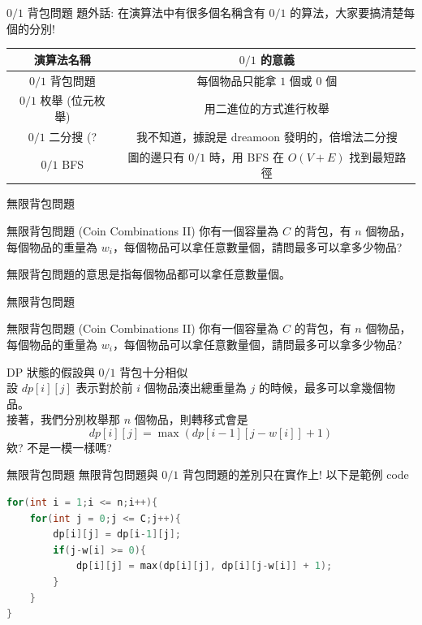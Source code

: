 \documentclass[aspectratio=169]{beamer}
\begin{document}
\begin{frame}{$0/1$ 背包問題}
    題外話: 在演算法中有很多個名稱含有 $0/1$ 的算法，大家要搞清楚每個的分別!
    \begin{center}
        \begin{tabular}{|c|c|}
            \hline 
            演算法名稱 & $0/1$ 的意義 \\ \hline \hline
            $0/1$ 背包問題 & 每個物品只能拿 $1$ 個或 $0$ 個 \\ \hline
            $0/1$ 枚舉 (位元枚舉) & 用二進位的方式進行枚舉 \\ \hline
            $0/1$ 二分搜 (? & 我不知道，據說是 dreamoon 發明的，倍增法二分搜 \\ \hline
            $0/1$ BFS & 圖的邊只有 $0/1$ 時，用 BFS 在 $O(V+E)$ 找到最短路徑 \\ \hline
        \end{tabular}
    \end{center}
\end{frame}

\begin{frame}{無限背包問題}
    \begin{block}{無限背包問題 (Coin Combinations II)}
        你有一個容量為 $C$ 的背包，有 $n$ 個物品，每個物品的重量為 $w_i$，每個物品可以拿任意數量個，請問最多可以拿多少物品?
    \end{block} \pause
    無限背包問題的意思是指每個物品都可以拿任意數量個。
 \end{frame} 
 
\begin{frame}{無限背包問題}
    \begin{block}{無限背包問題 (Coin Combinations II)}
        你有一個容量為 $C$ 的背包，有 $n$ 個物品，每個物品的重量為 $w_i$，每個物品可以拿任意數量個，請問最多可以拿多少物品?
    \end{block} 
    DP 狀態的假設與 $0/1$ 背包十分相似 \\ \pause
    設 $dp[i][j]$ 表示對於前 $i$ 個物品湊出總重量為 $j$ 的時候，最多可以拿幾個物品。 \\ \pause
    接著，我們分別枚舉那 $n$ 個物品，則轉移式會是 
    $$dp[i][j] = \max(dp[i-1][j-w[i]]+1)$$ \pause
    欸? 不是一模一樣嗎?
\end{frame} 

\begin{frame}[fragile]{無限背包問題}
    無限背包問題與 $0/1$ 背包問題的差別只在實作上! 以下是範例 code \\
    \begin{center}
        \begin{lstlisting}[language=C++]
for(int i = 1;i <= n;i++){
    for(int j = 0;j <= C;j++){
        dp[i][j] = dp[i-1][j];
        if(j-w[i] >= 0){
            dp[i][j] = max(dp[i][j], dp[i][j-w[i]] + 1);
        }
    }
}
        \end{lstlisting}
    \end{center}
\end{frame} 
\end{document}
